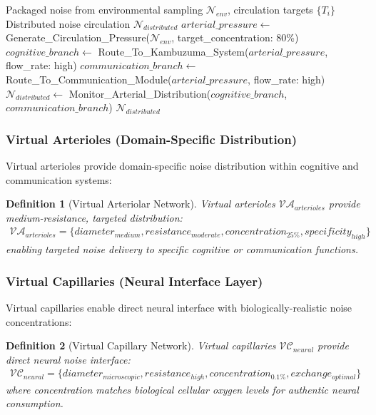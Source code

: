 \documentclass[12pt,a4paper]{article}
\newtheorem{definition}{Definition}
\begin{document}
\begin{algorithm}
\caption{Virtual Arterial Circulation}
\begin{algorithmic}[1]
\REQUIRE Packaged noise from environmental sampling $\mathcal{N}_{env}$, circulation targets $\{T_i\}$
\ENSURE Distributed noise circulation $\mathcal{N}_{distributed}$
\STATE $arterial\_pressure \leftarrow$ Generate\_Circulation\_Pressure($\mathcal{N}_{env}$, target\_concentration: 80\%)
\STATE $cognitive\_branch \leftarrow$ Route\_To\_Kambuzuma\_System($arterial\_pressure$, flow\_rate: high)
\STATE $communication\_branch \leftarrow$ Route\_To\_Communication\_Module($arterial\_pressure$, flow\_rate: high)
\STATE $\mathcal{N}_{distributed} \leftarrow$ Monitor\_Arterial\_Distribution($cognitive\_branch$, $communication\_branch$)
\RETURN $\mathcal{N}_{distributed}$
\end{algorithmic}
\end{algorithm}

\subsubsection{Virtual Arterioles (Domain-Specific Distribution)}

Virtual arterioles provide domain-specific noise distribution within cognitive and communication systems:

\begin{definition}[Virtual Arteriolar Network]
Virtual arterioles $\mathcal{VA}_{arterioles}$ provide medium-resistance, targeted distribution:
\begin{align}
\mathcal{VA}_{arterioles} = \{diameter_{medium}, resistance_{moderate}, concentration_{25\%}, specificity_{high}\}
\end{align}
enabling targeted noise delivery to specific cognitive or communication functions.
\end{definition}

\subsubsection{Virtual Capillaries (Neural Interface Layer)}

Virtual capillaries enable direct neural interface with biologically-realistic noise concentrations:

\begin{definition}[Virtual Capillary Network]
Virtual capillaries $\mathcal{VC}_{neural}$ provide direct neural noise interface:
\begin{align}
\mathcal{VC}_{neural} = \{diameter_{microscopic}, resistance_{high}, concentration_{0.1\%}, exchange_{optimal}\}
\end{align}
where concentration matches biological cellular oxygen levels for authentic neural consumption.
\end{definition}
\end{document}

